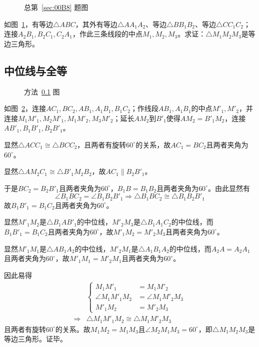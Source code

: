 

\begin{figure}[htbp]
  \centering {}
  \caption{总第~\ref{sec:00B8} 题图}
  \label{fig:00B8}
\end{figure}

如图~\ref{fig:00B8}，有等边$\triangle ABC$，其外有等边$\triangle AA_1A_2$、等边$\triangle BB_1B_2$、等边$\triangle CC_1C_2$；连接$A_2B_1, B_2C_1, C_2A_1$，作此三条线段的中点$M_1, M_2, M_3$。求证：$\triangle M_1M_2M_3$是等边三角形。

\subsection{中位线与全等} \label{subsec:00B8-meq}

\begin{figure}[htbp]
  \centering {}
  \caption{方法~\ref{subsec:00B8-meq} 图}
  \label{fig:00B8-meq}
\end{figure}

如图~\ref{fig:00B8-meq}，连接$AC_1, BC_2, AB_1, A_1B_1, B_1C_2$；作线段$AB_1, A_1B_1$的中点$M'_1, M'_2$，并连接$M_1M'_1, M_2M'_1, M_1M'_2, M_3M'_2$；延长$AM_2$到$B'_1$使得$AM_2 = B'_1M_2$，连接$AB'_1, B_1B'_1, B_2B'_1$。

显然$\triangle ACC_1 \cong \triangle BCC_2$，且两者有旋转$60^\circ$的关系，故$AC_1 = BC_2$且两者夹角为$60^\circ$。

显然$\triangle AM_2C_1 \cong \triangle B'_1M_2B_2$，故$AC_1 \parallel B_2B'_1$。

于是$BC_2 = B_2B'_1$且两者夹角为$60^\circ$，$B_1B = B_1B_2$且两者夹角为$60^\circ$。由此显然有
\[ \angle B_1BC_2 = \angle B_1B_2B'_1 \Rightarrow \triangle B_1BC_2 \cong \triangle B_1B_2B'_1 \]
故$B_1B'_1 = B_1C_2$且两者夹角为$60^\circ$。

显然$M'_1M_2$是$\triangle B_1AB'_1$的中位线，$M'_2M_3$是$\triangle B_1A_1C_2$的中位线，而$B_1B'_1 = B_1C_2$且两者夹角为$60^\circ$，故$M'_1M_2 = M'_2M_3$且两者夹角为$60^\circ$。

显然$M'_1M_1$是$\triangle AB_1A_2$的中位线，$M'_2M_1$是$\triangle A_1B_1A_2$的中位线，而$A_2A = A_2A_1$且两者夹角为$60^\circ$，故$M'_1M_1 = M'_2M_1$且两者夹角为$60^\circ$。

因此易得
\begin{align*}
  & \left\{ \begin{aligned}
    M_1M'_1 &= M_1M'_2 \\
    \angle M_1M'_1M_2 &= \angle M_1M'_2M_3 \\
    M'_1M_2 &= M'_2M_3
  \end{aligned} \right. \\
  \Rightarrow{}& \triangle M_1M'_1M_2 \cong \triangle M_1M'_2M_3
\end{align*}
且两者有旋转$60^\circ$的关系。故$M_1M_2 = M_1M_3$且$\angle M_2M_1M_3 = 60^\circ$，即$\triangle M_1M_2M_3$是等边三角形。证毕。
